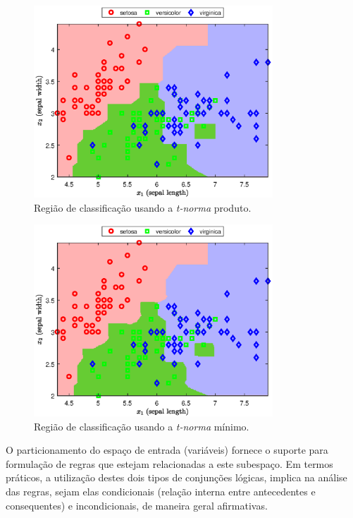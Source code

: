 \documentclass[12pt,a4paper]{article}
\numberwithin{equation}{section}
\begin{document}

\begin{figure}[ht!]
\centering
\includegraphics[width=0.8\textwidth]{figures/product.eps}
\caption{Região de classificação usando a \textit{t-norma} produto.}
\label{fig:product}
\end{figure}


\begin{figure}[ht!]
\centering
\includegraphics[width=0.8\textwidth]{figures/minimum.eps}
\caption{Região de classificação usando a \textit{t-norma} mínimo.}
\label{fig:minimum}
\end{figure}

O particionamento do espaço de entrada (variáveis) fornece o suporte para formulação de regras que estejam relacionadas a este subespaço. Em termos práticos, a utilização destes dois tipos de conjunções lógicas, implica na análise das regras, sejam elas condicionais (relação interna entre antecedentes e consequentes) e incondicionais, de maneira geral afirmativas. 
\end{document}
